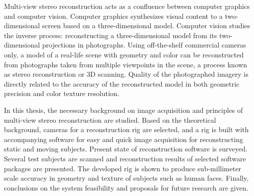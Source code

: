 \begin{abstractpage}[english]
Multi-view stereo reconstruction acts as a confluence between computer graphics and computer vision.
Computer graphics synthesizes visual content to a two-dimensional screen based on a three-dimensional model.
Computer vision studies the inverse process: reconstructing a three-dimensional model from its two-dimensional projections in photographs.
Using off-the-shelf commercial cameras only, a model of a real-life scene with geometry and color can be reconstructed from photographs taken from multiple viewpoints in the scene, a process known as stereo reconstruction or 3D scanning.
Quality of the photographed imagery is directly related to the accuracy of the reconstructed model in both geometric precision and color texture resolution.

In this thesis, the necessary background on image acquisition and principles of multi-view stereo reconstruction are studied.
Based on the theoretical background, cameras for a reconstruction rig are selected, and a rig is built with accompanying software for easy and quick image acquisition for reconstructing static and moving subjects.
Present state of reconstruction software is surveyed.
Several test subjects are scanned and reconstruction results of selected software packages are presented.
The developed rig is shown to produce sub-millimeter scale accuracy in geometry and texture of subjects such as human faces.
Finally, conclusions on the system feasibility and proposals for future research are given.
\end{abstractpage}

\newpage

\keywords{}
\begin{abstractpage}[finnish]
\end{abstractpage}
